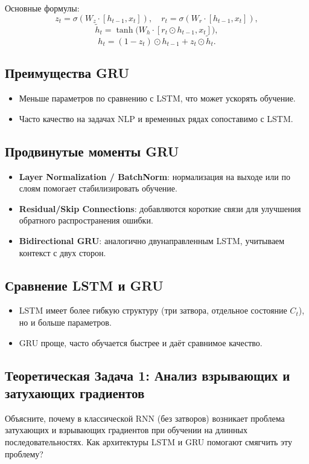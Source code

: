Основные формулы:
\[
z_t = \sigma(W_z \cdot [h_{t-1}, x_t]), \quad
r_t = \sigma(W_r \cdot [h_{t-1}, x_t]),
\]
\[
\tilde{h}_t = \tanh \bigl(W_h \cdot [r_t \odot h_{t-1}, x_t]\bigr),
\]
\[
h_t = (1 - z_t)\odot h_{t-1} + z_t \odot \tilde{h}_t.
\]

\subsection{Преимущества GRU}
\begin{itemize}
    \item Меньше параметров по сравнению с LSTM, что может ускорять обучение.
    \item Часто качество на задачах NLP и временных рядах сопоставимо с LSTM.
\end{itemize}

\subsection{Продвинутые моменты GRU}
\begin{itemize}
    \item \textbf{Layer Normalization / BatchNorm}: нормализация на выходе или по слоям помогает стабилизировать обучение.
    \item \textbf{Residual/Skip Connections}: добавляются короткие связи для улучшения обратного распространения ошибки.
    \item \textbf{Bidirectional GRU}: аналогично двунаправленным LSTM, учитываем контекст с двух сторон.
\end{itemize}

\subsection{Сравнение LSTM и GRU}
\begin{itemize}
    \item LSTM имеет более гибкую структуру (три затвора, отдельное состояние $C_t$), но и больше параметров.
    \item GRU проще, часто обучается быстрее и даёт сравнимое качество.
\end{itemize}


\subsection{Теоретическая Задача 1: Анализ взрывающих и затухающих градиентов}
Объясните, почему в классической RNN (без затворов) возникает проблема затухающих и взрывающих градиентов при обучении на длинных последовательностях. Как архитектуры LSTM и GRU помогают смягчить эту проблему?

